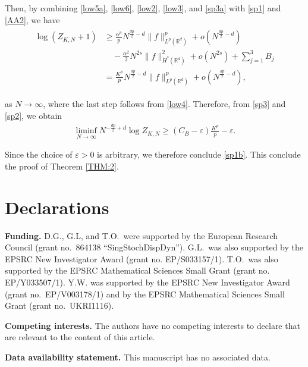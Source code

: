 \documentclass[letterpaper, 11pt,  reqno]{amsart}
\newcommand{\noi}{\noindent}
\newcommand{\R}{\mathbb{R}}
\newcommand{\eps}{\varepsilon}
\numberwithin{equation}{section}
\numberwithin{theorem}{section}
\begin{document}
\noi
Then, by combining 
\eqref{low5a}, 
\eqref{low6}, 
\eqref{low2},  \eqref{low3}, and \eqref{sp3a}
with \eqref{sp1} and \eqref{AA2}, we have 
\begin{align}
\begin{split}
\log (Z_{K, N} + 1)
&\ge \frac{\alpha^p}{p}
N^{\frac{dp}{2}-d}
\|f\|^p_{L^{p}(\R^d)} 
+o(N^{\frac{dp}{2}-d})\\
& \quad -\frac{\alpha^2}{2}N^{2s}\|f\|^2_{\dot H^s(\R^d)}+o(N^{2s})
 +\sum_{j = 1}^{3}B_j\\
&=\frac{K^p}{p}
N^{\frac{dp}{2}-d}
\|f\|^p_{L^{p}(\R^d)}
+o(N^{\frac{dp}{2}-d}),
\end{split}
\label{sp3}
\end{align}

\noi
as $N \to \infty$, 
where the last step follows from  \eqref{low4}.
Therefore, from \eqref{sp3} and \eqref{sp2}, 
we obtain 
\begin{align*}
\liminf_{N \to \infty}
N^{-\frac{dp}{2}+d}\log Z_{K, N}\ge 
(C_B- \eps) \frac{K^{p}}{p} - \eps.
\end{align*}

\noi
Since the choice of $\eps > 0$ is arbitrary, 
we therefore conclude 
\eqref{sp1b}.
This conclude the proof of Theorem \ref{THM:2}.









\section{Declarations}

\noi
{\bf Funding.}
D.G., G.L, and T.O.~were supported by the European Research Council
(grant no.~864138 ``SingStochDispDyn'').
G.L.~was also supported by the EPSRC New Investigator Award (grant no. EP/S033157/1).
T.O.~was also supported by the EPSRC Mathematical Sciences Small
Grant (grant no. EP/Y033507/1).
Y.W. was supported by  the EPSRC New Investigator
Award (grant no.~EP/V003178/1)
and by
 the EPSRC Mathematical Sciences Small Grant
 (grant no.~UKRI1116).






\medskip

\noi
{\bf Competing interests.}
The authors have no competing interests to declare that are relevant to the content of this article.


\medskip

\noi
{\bf Data availability statement.}
This manuscript has no associated data.
\end{document}

